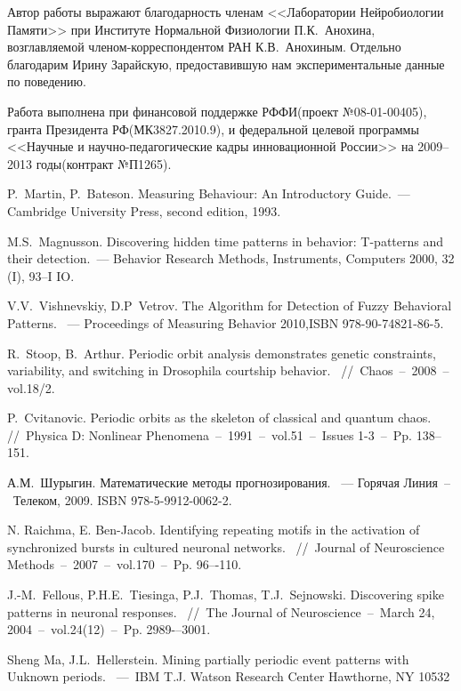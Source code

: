 \documentclass[12pt,fсeqn]{article}
\begin{document}
Автор работы выражают благодарность членам <<Лаборатории Нейробиологии Памяти>> при
Институте Нормальной Физиологии П.К.~Анохина, возглавляемой членом-корреспондентом РАН К.В.~Анохиным.
Отдельно благодарим Ирину Зарайскую, предоставившую нам экспериментальные данные по поведению.

Работа выполнена при финансовой поддержке РФФИ(проект №08-01-00405),
гранта Президента РФ(МК3827.2010.9),
и федеральной целевой программы <<Научные и научно-педагогические кадры инновационной России>>
на 2009--2013 годы(контракт №П1265).


\newpage

\begin{thebibliography}{00} %
P.~Martin, P.~Bateson. Measuring Behaviour: An Introductory Guide.~--- Cambridge University Press, second edition, 1993.

M.S.~Magnusson. Discovering hidden time patterns in behavior:
T-patterns and their detection.~--- Behavior Research Methods, Instruments, Computers
2000, 32 (I), 93--I IO.

V.V.~Vishnevskiy, D.P~Vetrov. The Algorithm for Detection of Fuzzy Behavioral Patterns.
~--- Proceedings of Measuring Behavior 2010,ISBN 978-90-74821-86-5.

R.~Stoop, B.~Arthur. Periodic orbit analysis demonstrates genetic constraints, variability, and switching in Drosophila courtship behavior.
~//~Chaos~--~2008~--vol.18/2.

P.~Cvitanovic. Periodic orbits as the skeleton of classical and quantum chaos.~
//~Physica D: Nonlinear Phenomena~--~1991~--~vol.51~--~Issues 1-3~--~Pp. 138--151.

А.М.~Шурыгин. Математические методы прогнозирования.
~--- Горячая Линия~--~Телеком, 2009. ISBN   978-5-9912-0062-2.

N. Raichma, E. Ben-Jacob.
Identifying repeating motifs in the activation of synchronized bursts in cultured neuronal networks.
~//~Journal of Neuroscience Methods~--~2007~--~vol.170~--~Pp. 96–-110.

J.-M.~Fellous, P.H.E.~Tiesinga, P.J.~Thomas, T.J.~Sejnowski.
Discovering spike patterns in neuronal responses.
~//~The Journal of Neuroscience~--~March 24, 2004~--~vol.24(12)~--~Pp. 2989-–3001.


Sheng Ma, J.L.~Hellerstein. Mining partially periodic event patterns with Uuknown periods.
~---~IBM T.J. Watson Research Center Hawthorne, NY 10532


\end{thebibliography}
\end{document}
